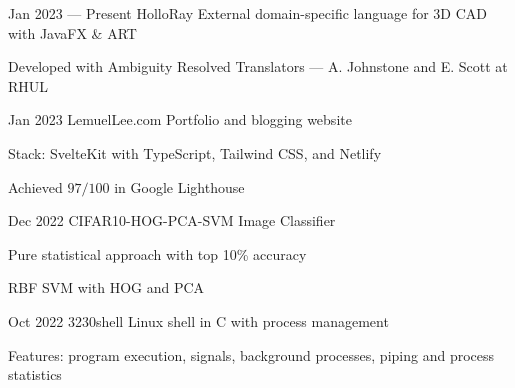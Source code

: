 \projectEntry
{Jan 2023 --- Present}
{HolloRay}
{External domain-specific language for 3D CAD with JavaFX \& ART}
{
\begin{descitemize}
	\item Developed with Ambiguity Resolved Translators --- A. Johnstone and E. Scott at RHUL
\end{descitemize}
}

\projectEntry
{Jan 2023}
{LemuelLee.com}
{Portfolio and blogging website}
{
\begin{descitemize}
    \item Stack: SvelteKit with TypeScript, Tailwind CSS, and Netlify
	\item Achieved $97/100$ in Google Lighthouse
\end{descitemize}
}

\projectEntry
{Dec 2022}
{CIFAR10-HOG-PCA-SVM}
{Image Classifier}
{
\begin{descitemize}
    \specialitem Pure statistical approach with top 10\% accuracy
    \item RBF SVM with HOG and PCA
\end{descitemize}
}


\projectEntry
{Oct 2022}
{3230shell}
{Linux shell in C with process management}
{
\begin{descitemize}
    \item Features: program execution, signals, background processes, piping and process statistics
\end{descitemize}
}

